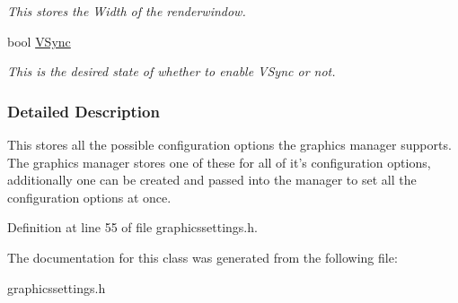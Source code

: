 \begin{DoxyCompactItemize}
\begin{DoxyCompactList}\small\item\em This stores the Width of the renderwindow. \item\end{DoxyCompactList}\item 
\hypertarget{structMezzanine_1_1GraphicsSettings_a4c9fa45eb140eef087302bc0f55b18b1}{
bool \hyperlink{structMezzanine_1_1GraphicsSettings_a4c9fa45eb140eef087302bc0f55b18b1}{VSync}}
\label{structMezzanine_1_1GraphicsSettings_a4c9fa45eb140eef087302bc0f55b18b1}

\begin{DoxyCompactList}\small\item\em This is the desired state of whether to enable VSync or not. \item\end{DoxyCompactList}\end{DoxyCompactItemize}


\subsubsection{Detailed Description}
This stores all the possible configuration options the graphics manager supports. The graphics manager stores one of these for all of it's configuration options, additionally one can be created and passed into the manager to set all the configuration options at once. 

Definition at line 55 of file graphicssettings.h.



The documentation for this class was generated from the following file:\begin{DoxyCompactItemize}
\item 
graphicssettings.h\end{DoxyCompactItemize}
